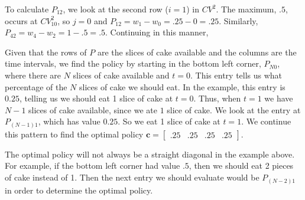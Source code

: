 To calculate $P_{12}$, we look at the second row ($i=1$) in $CV^2$.
The maximum, $.5$, occurs at $CV_{10}^2$, so $j=0$ and $P_{12} = w_1-w_0 = .25-0=.25$.
Similarly, $P_{42} = w_4-w_2 = 1-.5 = .5$.
Continuing in this manner,
\begin{center}
\end{center}

Given that the rows of $P$ are the slices of cake available and the columns are the time intervals, we find the policy by starting in the bottom left corner, $P_{N0}$, where there are $N$ slices of cake available and $t=0$.
This entry tells us what percentage of the $N$ slices of cake we should eat.
In the example, this entry is $0.25$, telling us we should eat 1 slice of cake at $t=0$.
Thus, when $t=1$ we have $N-1$ slices of cake available, since we ate $1$ slice of cake.
We look at the entry at $P_{(N-1)1}$, which has value $0.25$.
So we eat 1 slice of cake at $t=1$.
We continue this pattern to find the optimal policy $\mathbf{c}=\begin{bmatrix}.25&.25&.25&.25\end{bmatrix}$.

\begin{warn}
The optimal policy will not always be a straight diagonal in the example above.
For example, if the bottom left corner had value $.5$, then we should eat 2 pieces of cake instead of 1.
Then the next entry we should evaluate would be $P_{(N-2)1}$ in order to determine the optimal policy.
\end{warn}

